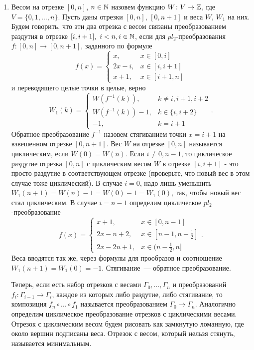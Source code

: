 \begin{enumerate}
\item Весом на отрезке $[0,n]$, $n\in\mathbb{N}$ назовем функцию $W\colon V\to\mathbb{Z}$, где $V=\{0, 1, \dots, n\}$. Пусть даны отрезки $[0,n]$, $[0,n+1]$ и веса $W$, $W_1$ на них. Будем говорить, что эти два отрезка с весом связаны преобразованием раздутия в отрезке  $[i,i+1],\,\, i<n, i\in\mathbb{N}$, если для $pl_2$-преобразования $f\colon [0,n] \to [0,n+1]$, заданного по формуле
$$f(x)=\begin{cases}
x,& x\in[0,i]\\
2x-i,& x\in[i,i+1]\\
x + 1,& x\in[i+1,n]
\end{cases}
$$
и переводящего целые точки в целые, верно
$$
W_1(k)=\begin{cases}
W(f^{-1}(k)),&  k\neq i, {i+1}, {i+2}\\
W(f^{-1}(k))-1,&  k\in\{i, i+2\}\\
-1,& k=i+1
\end{cases}.
$$
Обратное преобразование $f^{-1}$ назовем стягиванием точки $x=i+1$ на взвешенном отрезке $[0,n+1]$.
Вес $W$ на отрезке $[0,n]$ называется циклическим, если $W(0)=W(n)$. Если $i\neq 0,n-1$, то циклическое раздутие отрезка $[0,n]$ с циклическим весом $W$ в отрезке $[i,i+1]$ - это просто раздутие в соответствующем отрезке (проверьте, что новый вес в этом случае тоже циклический). В случае $i=0$, надо лишь уменьшить $W_1(n+1)=W(n)-1=W(0)-1=W_1(0)$, так, чтобы новый вес стал циклическим. В случае $i=n-1$ определим цикличеcкое $pl_2$-преобразование 
$$f(x)=\begin{cases}
x+1,& x\in[0,n-1]\\
2x-n+2,& x\in[n-1,n-\frac{1}{2}]\\
2x-2n+1,& x\in(n-\frac{1}{2},n]
\end{cases}.
$$
Веса вводятся так же, через формулы для прообразов и соотношение $W_1(n+1)=W_1(0)=-1$. Стягивание~— обратное преобразование.

 Теперь, если есть набор отрезков с весами  $\Gamma_0, \dots, \Gamma_n$ и преобразований $f_i\colon \Gamma_{i-1}\to\Gamma_{i}$, каждое из которых либо раздутие, либо стягивание, то композиция $f_n\circ ... \circ f_1$ называется преобразованием $\Gamma_0 \to \Gamma_n$. Аналогично определим циклическое преобразование отрезков с циклическими весами.
Отрезок с циклическим весом будем рисовать как замкнутую ломанную, где около вершин подписаны веса. 
Отрезок с весом, который нельзя стянуть, называется минимальным.


\end{enumerate}

